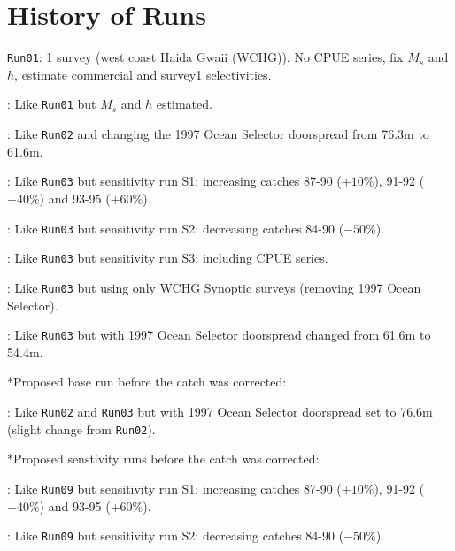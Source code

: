 
\section*{History of Runs}

{\tt Run01}: 1 survey (west coast Haida Gwaii (WCHG)). No CPUE series, fix $M_s$ and $h$, estimate commercial and survey1 selectivities. \newline  

: Like {\tt Run01} but $M_s$ and $h$ estimated. \newline

: Like {\tt Run02} and changing the 1997 Ocean Selector doorspread from 76.3m to 61.6m. \newline

: Like {\tt Run03} but sensitivity run S1: increasing catches 87-90 ($+10\%$), 91-92 ($+40\%$) and 93-95 ($+60\%$). \newline

: Like {\tt Run03} but sensitivity run S2: decreasing catches 84-90 ($-50\%$). \newline

: Like {\tt Run03} but sensitivity run S3: including CPUE series. \newline

: Like {\tt Run03} but using only WCHG Synoptic surveys (removing 1997 Ocean Selector). \newline

: Like {\tt Run03} but with 1997 Ocean Selector doorspread changed from 61.6m to 54.4m. \newline


\noindent **Proposed base run before the catch was corrected:

: Like {\tt Run02} and {\tt Run03} but with 1997 Ocean Selector doorspread set to 76.6m (slight change from {\tt Run02}).  \newline

\noindent **Proposed senstivity runs before the catch was corrected:

: Like {\tt Run09} but sensitivity run S1: increasing catches 87-90 ($+10\%$), 91-92 ($+40\%$) and 93-95 ($+60\%$). \newline

: Like {\tt Run09} but sensitivity run S2: decreasing catches 84-90 ($-50\%$). \newline


